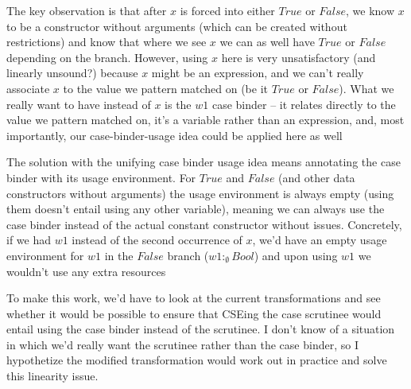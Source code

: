 \documentclass[a4paper, draft]{report}
\begin{document}
The key observation is that after $x$ is forced into either $True$ or $False$,
we know $x$ to be a constructor without arguments (which can be created
without restrictions) and know that where we see $x$ we can as well have
$True$ or $False$ depending on the branch. However, using $x$ here is very
unsatisfactory (and linearly unsound?) because $x$ might be an expression, and
we can't really associate $x$ to the value we pattern matched on (be it $True$
or $False$). What we really want to have instead of $x$ is the $w1$ case binder --
it relates directly to the value we pattern matched on, it's a variable rather
than an expression, and, most importantly, our case-binder-usage idea could be
applied here as well


The solution with the unifying case binder usage idea means annotating the case
binder with its usage environment. For $True$ and $False$ (and other data
constructors without arguments) the usage environment is always empty (using
them doesn't entail using any other variable), meaning we can always use the
case binder instead of the actual constant constructor without issues.
%
Concretely, if we had $w1$ instead of the second occurrence of $x$, we'd have
an empty usage environment for $w1$ in the $False$ branch ($w1 :_\emptyset
Bool$) and upon using $w1$ we wouldn't use any extra resources


To make this work, we'd have to look at the current transformations and see
whether it would be possible to ensure that CSEing the case scrutinee would
entail using the case binder instead of the scrutinee. I don't know of a
situation in which we'd really want the scrutinee rather than the case binder,
so I hypothetize the modified transformation would work out in practice and
solve this linearity issue.


\end{document}
